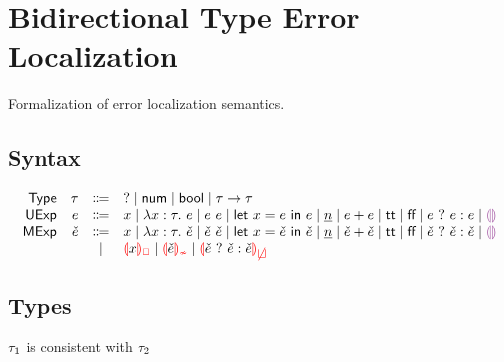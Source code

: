\documentclass{article}
\begin{document}
\renewcommand{\thesection}{\Alph{section}}
\section{Bidirectional Type Error Localization}
Formalization of error localization semantics.

\subsection{Syntax}
\[\begin{array}{rrcl}
  \TMName  & \TMV  & \Coloneqq & \TUnknown \mid \TNum \mid \TBool \mid \TArrow{\TMV}{\TMV} \\
  \EMName  & \EMV  & \Coloneqq & x \mid \ELam{x}{\TMV}{\EMV} \mid \EAp{\EMV}{\EMV} \mid \ELet{x}{\EMV}{\EMV}
                     \mid           \ENumMV \mid \EPlus{\EMV}{\EMV}
                     \mid           \ETrue \mid \EFalse \mid \EIf{\EMV}{\EMV}{\EMV}
                     \mid           \EEHole \\
  \ECMName & \ECMV & \Coloneqq & x \mid \ECLam{x}{\TMV}{\ECMV} \mid \ECAp{\ECMV}{\ECMV} \mid \ECLet{x}{\ECMV}{\ECMV}
                     \mid           \ECNumMV \mid \ECPlus{\ECMV}{\ECMV}
                     \mid           \ECTrue \mid \ECFalse \mid \ECIf{\ECMV}{\ECMV}{\ECMV}
                     \mid           \ECEHole \\
           &       & \mid         & \ECUnbound{x} \mid \ECInconType{\ECMV} \mid \ECInconBr{\ECMV}{\ECMV}{\ECMV} \\
\end{array}\]

\subsection{Types}
 $\TMV_1$ is consistent with $\TMV_2$
%
\begin{mathpar}



\end{mathpar} \\
\end{document}
